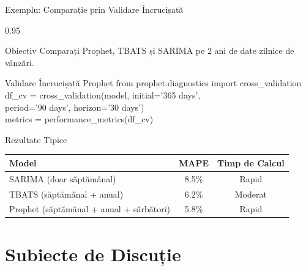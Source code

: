 \documentclass[9pt, aspectratio=169, t]{beamer}
\begin{document}
\begin{frame}{Exemplu: Comparație prin Validare Încrucișată}
    \begin{cminipage}{0.95\textwidth}
    {\footnotesize
    \begin{block}{Obiectiv}
        Comparați Prophet, TBATS și SARIMA pe 2 ani de date zilnice de vânzări.
    \end{block}
    \begin{exampleblock}{Validare Încrucișată Prophet}
        {\scriptsize\ttfamily
        from prophet.diagnostics import cross\_validation\\
        df\_cv = cross\_validation(model, initial='365 days',\\
        \quad period='90 days', horizon='30 days')\\
        metrics = performance\_metrics(df\_cv)
        }
    \end{exampleblock}
    \begin{block}{Rezultate Tipice}
        \begin{center}
        \begin{tabular}{lcc}
            \toprule
            Model & MAPE & Timp de Calcul \\
            \midrule
            SARIMA (doar săptămânal) & 8.5\% & Rapid \\
            TBATS (săptămânal + anual) & 6.2\% & Moderat \\
            Prophet (săptămânal + anual + sărbători) & 5.8\% & Rapid \\
            \bottomrule
        \end{tabular}
        \end{center}
    \end{block}
    }
    \end{cminipage}
\end{frame}

\section{Subiecte de Discuție}
\end{document}
